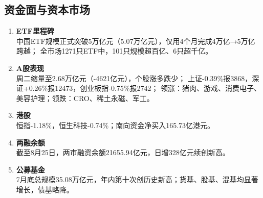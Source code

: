 \subsection{资金面与资本市场}
\begin{enumerate}[leftmargin=*, nosep]
    \item \textbf{ETF里程碑}  \\
    中国ETF规模正式突破5万亿元（5.07万亿元），仅用4个月完成4万亿→5万亿跨越；  
    全市场1271只ETF中，101只规模超百亿、6只超千亿。
    \item \textbf{A股表现}  \\
    周二缩量至2.68万亿元（-4621亿元），个股涨多跌少；  
    上证-0.39\%报3868，深证+0.26\%报12473，创业板指-0.75\%报2742；  
    领涨：猪肉、游戏、消费电子、美容护理；领跌：CRO、稀土永磁、军工。
    \item \textbf{港股}  \\
    恒指-1.18\%，恒生科技-0.74\%；南向资金净买入165.73亿港元。
    \item \textbf{两融余额}  \\
    截至8月25日，两市融资余额21655.94亿元，日增328亿元续创新高。
    \item \textbf{公募基金}  \\
    7月底总规模35.08万亿元，年内第十次创历史新高；货基、股基、混基均显著增长，债基略降。
\end{enumerate}

